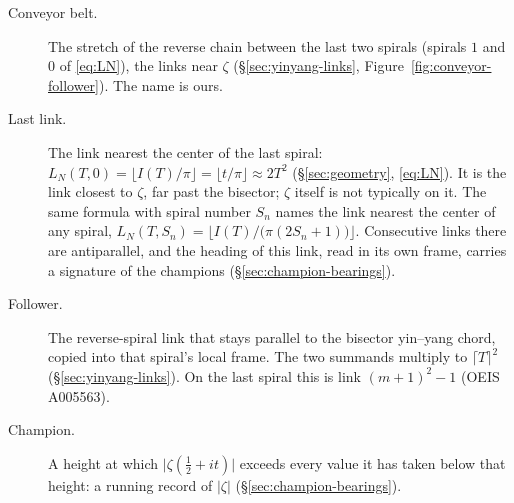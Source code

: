 \documentclass[11pt]{article}
\theoremstyle{definition}
\begin{document}
\begin{description}
\item[Conveyor belt.]
The stretch of the reverse chain between the last two spirals
(spirals $1$ and $0$ of \eqref{eq:LN}), the links near $\zeta$
(\S\ref{sec:yinyang-links}, Figure~\ref{fig:conveyor-follower}).
The name is ours.

\item[Last link.]
The link nearest the center of the last spiral:
$L_N(T,0)=\lfloor I(T)/\pi\rfloor=\lfloor t/\pi\rfloor\approx 2T^{2}$
(\S\ref{sec:geometry}, \eqref{eq:LN}).
It is the link closest to $\zeta$, far past the bisector; $\zeta$
itself is not typically on it.
The same formula with spiral number $S_n$ names the link nearest the
center of any spiral,
$L_N(T,S_n)=\bigl\lfloor I(T)/\bigl(\pi(2S_n+1)\bigr)\bigr\rfloor$.
Consecutive links there are antiparallel, and the heading of this
link, read in its own frame, carries a signature of the champions
(\S\ref{sec:champion-bearings}).

\item[Follower.]
The reverse-spiral link that stays parallel to the
bisector yin--yang chord, copied into that spiral's local frame.
The two summands multiply to $\lceil T\rceil^{2}$
(\S\ref{sec:yinyang-links}).
On the last spiral this is link $(m+1)^{2}-1$ (OEIS A005563).

\item[Champion.]
A height at which $\bigl|\zeta(\tfrac12+it)\bigr|$ exceeds every
value it has taken below that height: a running record of
$|\zeta|$ (\S\ref{sec:champion-bearings}).
\end{description}
\end{document}
